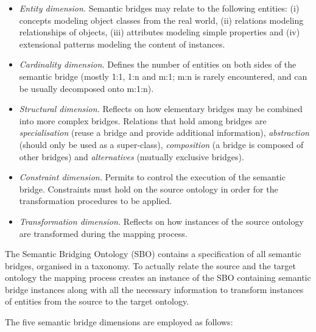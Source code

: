 \begin{itemize}
\item \textit{Entity dimension.} Semantic bridges may relate to the
following entities: (i) concepts modeling object classes from the real
world, (ii) relations modeling relationships of objects, (iii)
attributes modeling simple properties and (iv) extensional patterns
modeling the content of instances. 
\item \textit{Cardinality dimension.} Defines the number of entities on
both sides of the semantic bridge (mostly 1:1, 1:n and m:1; m:n is
rarely encountered, and can be usually decomposed onto m:1:n). 
\item \textit{Structural dimension.} Reflects on how elementary bridges
may be combined into more complex bridges. Relations that hold among
bridges are \textit{specialisation} (reuse a bridge and provide
additional information), \textit{abstraction} (should only be used as a
super-class), \textit{composition} (a bridge is composed of other
bridges) and \textit{alternatives} (mutually exclusive bridges). 
\item \textit{Constraint dimension.} Permits to control the execution of
the semantic bridge. Constraints must hold on the source ontology in
order for the transformation procedures to be applied. 
\item \textit{Transformation dimension.} Reflects on how instances of
the source ontology are transformed during the mapping process. 
\end{itemize}
The Semantic Bridging Ontology (SBO) contains a specification of all
semantic bridges, organised in a taxonomy. To actually relate the
source and the target ontology the mapping process creates an instance
of the SBO containing semantic bridge instances along with all the
necessary information to transform instances of entities from the
source to the target ontology. 

The five semantic bridge dimensions are employed as follows: 


